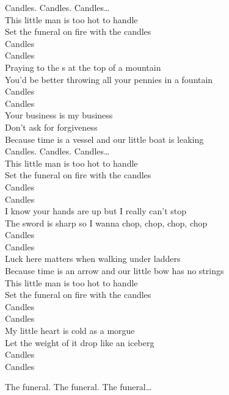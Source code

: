 


Candles. Candles. Candles… \\

This little man is too hot to handle \\
Set the funeral on fire with the candles \\
Candles \\
Candles \\
Praying to the s at the top of a mountain \\
You'd be better throwing all your pennies in a fountain \\
Candles \\
Candles \\

Your business is my business \\
Don't ask for forgiveness \\
Because time is a vessel and our little boat is leaking \\

Candles. Candles. Candles… \\

This little man is too hot to handle \\
Set the funeral on fire with the candles \\
Candles \\
Candles \\
I know your hands are up but I really can't stop \\
The sword is sharp so I wanna chop, chop, chop, chop \\
Candles \\
Candles \\

Luck here matters when walking under ladders \\
Because time is an arrow and our little bow has no strings \\

This little man is too hot to handle \\
Set the funeral on fire with the candles \\
Candles \\
Candles \\
My little heart is cold as a morgue \\
Let the weight of it drop like an iceberg \\
Candles \\
Candles \\




The funeral. The funeral. The funeral… \\
